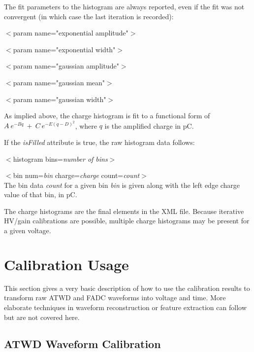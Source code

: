 \documentclass[10pt]{article}
\begin{document}
The fit parameters to the histogram are always reported, even if the fit
was not convergent (in which case the last iteration is recorded):

\bi
\item{$<$param name="exponential amplitude"$>$}
\item{$<$param name="exponential width"$>$}
\item{$<$param name="gaussian amplitude"$>$}
\item{$<$param name="gaussian mean"$>$}
\item{$<$param name="gaussian width"$>$}
\ei

As implied above, the charge histogram is fit to a functional form of
$A\ e^{-Bq}\ +\ C\ e^{-E(q-D)^2}$, where $q$ is the amplified charge in
pC.

If the \textit{isFilled} attribute is true, the raw histogram data follows:

\bi
\item{$<$histogram bins=\textit{number of bins}$>$}
\bi
\item{$<$bin num=\textit{bin} charge=\textit{charge}
  count=\textit{count}$>$}\\
The bin data \textit{count} for a given bin \textit{bin} is given along
with the left edge charge value of that bin, in pC.
\ei
\ei %

The charge histograms are the final elements in the XML file.  Because
iterative HV/gain calibrations are possible, multiple charge histograms may
be present for a given voltage.  


\ei %
\ei %


\section{Calibration Usage}
\label{calusage}

This section gives a very basic description of how to use the calibration
results to transform raw ATWD and FADC waveforms into voltage and time.
More elaborate techniques in waveform reconstruction or feature extraction can
follow but are not covered here.

\subsection{ATWD Waveform Calibration}
\end{document}
